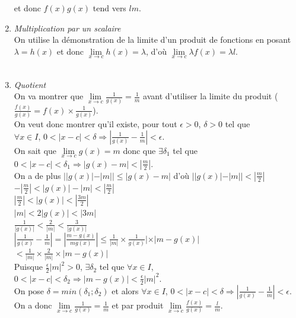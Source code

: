 \documentclass[a4paper,10pt]{book} %
\begin{document}
\begin{enumerate}
et donc $f(x)g(x)$ tend vers $lm$.

\newpage

\item \emph{Multiplication par un scalaire}\\

On utilise la démonstration de la limite d'un produit de fonctions en posant $\lambda=h(x)$ et donc $\lim\limits_{x\rightarrow c} h(x)=\lambda$, d'où $\lim\limits_{x\rightarrow c}\lambda f(x)=\lambda l$.\\\\

\item \emph{Quotient}\\

On va montrer que $\lim\limits_{x\rightarrow c} \frac{1}{g(x)}=\frac{1}{m}$ avant d'utiliser la limite du produit ($\frac{f(x)}{g(x)}=f(x)\times \frac{1}{g(x)}$).\\

On veut donc montrer qu'il existe, pour tout $\epsilon>0$, $\delta>0$ tel que \\
$\forall x\in I$, $0<|x-c|<\delta \Rightarrow |\frac{1}{g(x)}-\frac{1}{m}|<\epsilon$.\\

On sait que $\lim\limits_{x\rightarrow c}g(x)=m$ donc que $\exists\delta_{1}$ tel que $0<|x-c|<\delta_{1}\Rightarrow |g(x)-m|<|\frac{m}{2}|$.\\

On a de plus $||g(x)|-|m||\leq|g(x)-m|$ d'où $||g(x)|-|m||<|\frac{m}{2}|$\\
\hspace*{6.5cm}$-|\frac{m}{2}|<|g(x)|-|m|<|\frac{m}{2}|$\\
\hspace*{7cm}$|\frac{m}{2}|<|g(x)|<|\frac{3m}{2}|$\\
\hspace*{7cm}$|m|<2|g(x)|<|3m|$\\
\hspace*{7cm}$\frac{1}{|g(x)|}< \frac{2}{|m|}<\frac{3}{|g(x)|}$\\

$|\frac{1}{g(x)}-\frac{1}{m}|=|\frac{m-g(x)}{mg(x)}| \leq \frac{1}{|m|}\times \frac{1}{g(x)}|\times|m-g(x)|$\\
\hspace*{1.55cm} $<\frac{1}{|m|}\times \frac{2}{|m|}\times |m-g(x)|$\\

Puisque $\frac{\epsilon}{2}|m|^{2}>0$, $\exists\delta_{2}$ tel que $\forall x\in I$, $0<|x-c|<\delta_{2}\Rightarrow |m-g(x)|<\frac{\epsilon}{2}|m|^{2}$.\\

On pose $\delta=min(\delta_{1};\delta_{2})$ et alors $\forall x\in I$, $0<|x-c|<\delta\Rightarrow |\frac{1}{g(x)}-\frac{1}{m}|<\epsilon$.\\

On a donc $\lim\limits_{x\rightarrow c}\frac{1}{g(x)}=\frac{1}{m}$ et par produit $\lim\limits_{x\rightarrow c}\frac{f(x)}{g(x)}=\frac{l}{m}$.\\\\
\end{enumerate}
\end{document}
